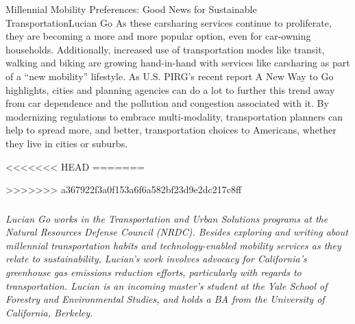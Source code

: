 \documentclass{papertex}
\begin{document}
\begin{news}{2}{Millennial Mobility Preferences: Good News for Sustainable Transportation}{Lucian Go}{}{}
As these carsharing services continue to proliferate, they are becoming a 
more and more popular option, even for car-owning households. Additionally, 
increased use of transportation modes like transit, walking and biking are 
growing hand-in-hand with services like carsharing as part of a ``new 
mobility'' lifestyle. As U.S. PIRG’s recent report A New Way to Go 
highlights, cities and planning agencies can do a lot to further this trend 
away from car dependence and the pollution and congestion associated with it. 
By modernizing regulations to embrace multi-modality, transportation planners 
can help to spread more, and better, transportation choices to Americans, 
whether they live in cities or suburbs.

<<<<<<< HEAD
=======

>>>>>>> a367922f3a0f153a6f6a582bf23d9e2dc217c8ff
\subsubsection*{}

\emph{Lucian Go works in the Transportation and Urban Solutions programs at 
the Natural Resources Defense Council (NRDC). Besides exploring and writing 
about millennial transportation habits and technology-enabled mobility 
services as they relate to sustainability, Lucian’s work involves advocacy 
for California’s greenhouse gas emissions reduction efforts, particularly 
with regards to transportation. Lucian is an incoming master’s student at the 
Yale School of Forestry and Environmental Studies, and holds a BA from the 
University of California, Berkeley.}

\end{news}
\end{document}
